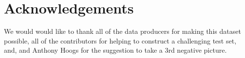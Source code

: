 \documentclass[10pt,twocolumn,letterpaper]{article}
\begin{document}
\section{Acknowledgements}
We would would like to thank all of the data producers for making this dataset possible, all of the
  contributors for helping to construct a challenging test set, and, and Anthony Hoogs for the suggestion to
  take a 3rd negative picture.


{\small


}
%


\begin{comment}
    cd $HOME/code/shitspotter
    python -m shitspotter.cli.coco_annotation_stats $HOME/data/dvc-repos/shitspotter_dvc/data.kwcoco.json \
        --dst_fpath $HOME/code/shitspotter/coco_annot_stats/stats.json \
        --dst_dpath $HOME/code/shitspotter/coco_annot_stats

    SeeAlso:
    ~/code/shitspotter/experiments/run_pixel_eval_pipeline.sh
    ~/code/shitspotter/experiments/run_pixel_eval_on_test_pipeline.sh
    ~/code/shitspotter/experiments/run_pixel_eval_on_train_pipeline.sh

    python ~/code/shitspotter/dev/poc/estimate_train_resources.py

    See: ./localize_figures.sh


    Best Validation Model:
        /home/joncrall/data/dvc-repos/shitspotter_expt_dvc/training/toothbrush/joncrall/ShitSpotter/runs/shitspotter_scratch_20240618_noboxes_v7/lightning_logs/version_1/checkpoints/epoch=0089-step=122940-val_loss=0.019.ckpt.pt
        # Best Rank:  33.0 pyzvffmyjcrq
        Lives in /home/joncrall/data/dvc-repos/shitspotter_expt_dvc/_shitspotter_test_evals/eval/flat/heatmap_eval/heatmap_eval_id_0f613533/pxl_eval.json heatmap_eval           pyzvffmyjcrq    0.505110     0.912509
        

    Best Test Model:
        /home/joncrall/data/dvc-repos/shitspotter_expt_dvc/training/toothbrush/joncrall/ShitSpotter/runs/shitspotter_scratch_20240618_noboxes_v6/lightning_logs/version_0/checkpoints/epoch=0073-step=101084-val_loss=0.017.ckpt.pt
        is Rank 3 on the validation dataset.
    

    cd /home/joncrall/code/shitspotter/shitspotter_dvc
    geowatch spectra --src data.kwcoco.json --workers=16 --cache_dpath=_spectra_cache --dst spectra.png --bins 64 --valid_range=0:255
    cp spectra.png ~/code/shitspotter/papers/application-2024/figures/spectra.png

\end{comment}
\end{document}
